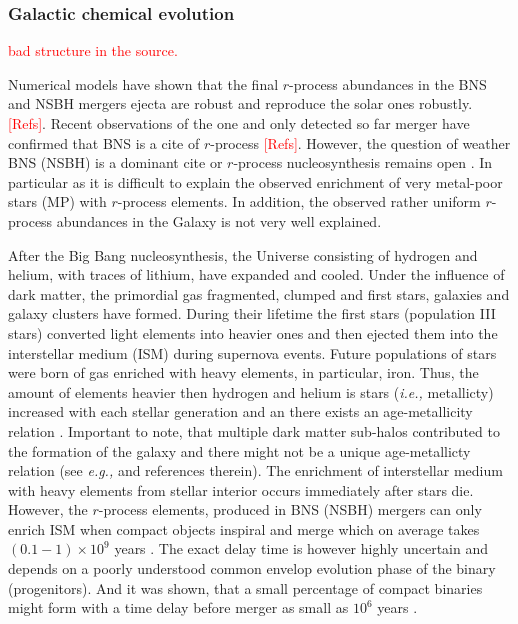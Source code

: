 \documentclass[11pt,a4paper,headinclude=true,DIV=14,BCOR=8mm,chapterprefix,listof=totoc,twoside,openright,abstracton]{scrbook}
\newcommand{\red}[1]{\textcolor{red}{#1}}
\begin{document}

\subsubsection{Galactic chemical evolution}
\red{bad structure in the source.}

Numerical models have shown that the final $r$-process abundances in the BNS and NSBH mergers ejecta are robust and reproduce the solar ones robustly. \cite{Freiburghaus:1999,Goriely:2011vg,Goriely:2015fqa,Wanajo:2014,Just:2014,Radice:2016dwd}\red{[Refs]}. Recent observations of the one and only detected so far merger have confirmed that BNS is a cite of $r$-process \red{[Refs]}.
However, the question of weather BNS (NSBH) is a dominant cite or $r$-process nucleosynthesis remains open \cite{Qian:2000bh,Argast:2003he,Matteucci:2014}. 
In particular as it is difficult to explain the observed enrichment of very metal-poor stars (MP) with $r$-process elements. In addition, the observed rather uniform $r$-process abundances in the Galaxy is not very well explained.

After the Big Bang nucleosynthesis, the Universe consisting of hydrogen and helium, with traces of lithium, have expanded and cooled. Under the influence of dark matter, the primordial gas fragmented, clumped and first stars, galaxies and galaxy clusters have formed. During their lifetime the first stars (population III stars) converted light elements into heavier ones and then ejected them into the interstellar medium (ISM) during supernova events. Future populations of stars were born of gas enriched with heavy elements, in particular, iron. Thus, the amount of elements heavier then hydrogen and helium is stars (\textit{i.e.,} metallicty) increased with each stellar generation and an there exists an age-metallicity relation  \cite{Matteucci:2012}. Important to note, that multiple dark matter sub-halos contributed to the formation of the galaxy and there might not be a unique age-metallicty relation (see \textit{e.g.,} \cite{Ishimaru:2015} and references therein).
The enrichment of interstellar medium with heavy elements from stellar interior occurs immediately after stars die. However, the $r$-process elements, produced in BNS (NSBH) mergers can only enrich ISM when compact objects inspiral and merge which on average takes $(0.1-1)\times10^{9}$ years \cite{DeDonder:2004cx,Dominik:2012kk}. The exact delay time is however highly uncertain and depends on a poorly understood common envelop evolution phase of the binary (progenitors). And it was shown, that a small percentage of compact binaries might form with a time delay before merger as small as $10^{6}$ years \cite{Dominik:2012kk}. 
\end{document}
